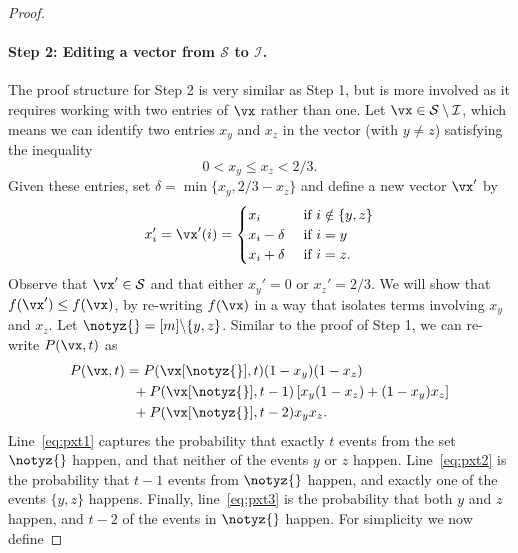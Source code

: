 \begin{proof}
	\paragraph{Step 2: Editing a vector from $\mathcal{S}$ to $\mathcal{I}$.}
	The proof structure for Step 2 is very similar as Step 1, but is more involved as it requires working with two entries of $\vx$ rather than one. Let $\vx \in \mathcal{S} \setminus \mathcal{I}$, which means we can identify two entries $x_y$ and $x_z$ in the vector (with $y \neq z$) satisfying the inequality
	\begin{equation}
		\label{eq:yzinequality}
		0 < x_y \leq x_z < 2/3.
	\end{equation}
	Given these entries, set $\delta = \min\{x_y, 2/3 - x_z \}$ and define a new vector $\vx'$ by
	\begin{equation}
		x_i' = \vx'(i) = \begin{cases}
			x_i          & \text{ if $i \notin \{y,z\}$} \\
			x_i - \delta & \text{ if $i = y$}            \\
			x_i + \delta & \text{ if $i = z$.}
		\end{cases}
	\end{equation}
	Observe that $\vx' \in \mathcal{S}$ and that either $x_y' = 0$ or $x_z' = 2/3$. We will show that $f(\vx') \leq f(\vx)$, by re-writing $f(\vx)$ in a way that isolates terms involving $x_y$ and $x_z$. Let $\notyz{} = [m] \backslash \{y,z\}$. Similar to the proof of Step 1, we can re-write $P(\vx,t)$ as
	\begin{align}
		P(\vx,t) & = P(\vx[\notyz{}],t) (1-x_y)(1-x_z) \label{eq:pxt1}                               \\
		         & \;\;+ P(\vx[\notyz{}], t-1) \left[x_y (1-x_z) + (1-x_y)x_z\right] \label{eq:pxt2} \\
		         & \;\; + P(\vx[\notyz{}], t-2) x_y x_z. \label{eq:pxt3}
	\end{align}
	Line~\eqref{eq:pxt1} captures the probability that exactly $t$ events from the set $\notyz{}$ happen, and that neither of the events $y$ or $z$ happen. Line~\eqref{eq:pxt2} is the probability that $t-1$ events from $\notyz{}$ happen, and exactly one of the events $\{y,z\}$ happens. Finally, line~\eqref{eq:pxt3} is the probability that both $y$ and $z$ happen, and $t-2$ of the events in $\notyz{}$ happen. For simplicity we now define

\end{proof}
